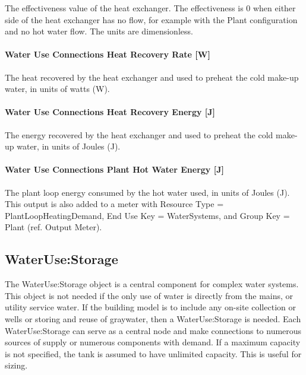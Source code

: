 The effectiveness value of the heat exchanger. The effectiveness is 0 when either side of the heat exchanger has no flow, for example with the Plant configuration and no hot water flow. The units are dimensionless.

\paragraph{Water Use Connections Heat Recovery Rate {[}W{]}}\label{water-use-connections-heat-recovery-rate-w}

The heat recovered by the heat exchanger and used to preheat the cold make-up water, in units of watts (W).

\paragraph{Water Use Connections Heat Recovery Energy {[}J{]}}\label{water-use-connections-heat-recovery-energy-j}

The energy recovered by the heat exchanger and used to preheat the cold make-up water, in units of Joules (J).

\paragraph{Water Use Connections Plant Hot Water Energy {[}J{]}}\label{water-use-connections-plant-hot-water-energy-j}

The plant loop energy consumed by the hot water used, in units of Joules (J). This output is also added to a meter with Resource Type = PlantLoopHeatingDemand, End Use Key = WaterSystems, and Group Key = Plant (ref. Output Meter).

\subsection{WaterUse:Storage}\label{waterusestorage}

The WaterUse:Storage object is a central component for complex water systems. This object is not needed if the only use of water is directly from the mains, or utility service water. If the building model is to include any on-site collection or wells or storing and reuse of graywater, then a WaterUse:Storage is needed. Each WaterUse:Storage can serve as a central node and make connections to numerous sources of supply or numerous components with demand. If a maximum capacity is not specified, the tank is assumed to have unlimited capacity. This is useful for sizing.

